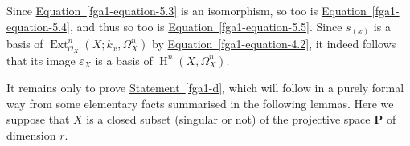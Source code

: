   
  Since \hyperref[fga1-equation-5.3]{Equation~\ref*{fga1-equation-5.3}} is an isomorphism, so too is \hyperref[fga1-equation-5.4]{Equation~\ref*{fga1-equation-5.4}}, and thus so too is \hyperref[fga1-equation-5.5]{Equation~\ref*{fga1-equation-5.5}}.
  Since \(s_{(x)}\) is a basis of \(\operatorname {Ext}_{\mathcal {O}_X}^n(X;k_x,\Omega _X^n)\) by \hyperref[fga1-equation-4.2]{Equation~\ref*{fga1-equation-4.2}}, it indeed follows that its image \(\varepsilon _X\) is a basis of \(\operatorname {H}^n(X,\Omega _X^n)\).\par{}It remains only to prove \hyperref[fga1-d]{Statement~\ref*{fga1-d}}, which will follow in a purely formal way from some elementary facts summarised in the following lemmas.
  Here we suppose that \(X\) is a closed subset (singular or not) of the projective space \(\mathbf {P}\) of dimension \(r\).
